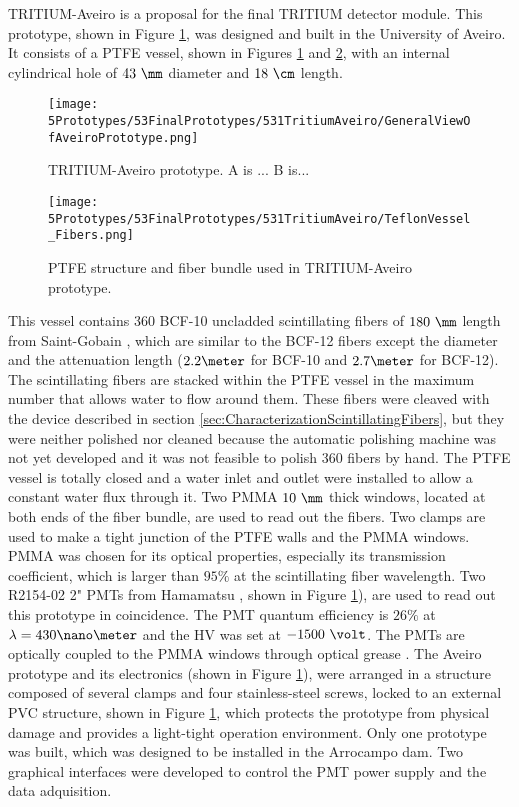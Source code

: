 TRITIUM-Aveiro is a proposal for the final TRITIUM detector module. This prototype, shown in Figure \ref{fig:TritiumAveiro0}, was designed and built in the University of Aveiro. It consists of a PTFE vessel, shown in Figures \ref{fig:TritiumAveiro0} and \ref{fig:TeflonStructureFibersTritiumAveiro0}, with an internal cylindrical hole of $43~\mm$ diameter and $18~\cm$ length.
\begin{figure}[h]
\centering
\texttt{[image: 5Prototypes/53FinalPrototypes/531TritiumAveiro/GeneralViewOfAveiroPrototype.png]}
\caption{TRITIUM-Aveiro prototype. A is ... B is...\label{fig:TritiumAveiro0}}
\end{figure}
\begin{figure}[h]
\centering
\texttt{[image: 5Prototypes/53FinalPrototypes/531TritiumAveiro/TeflonVessel\_Fibers.png]}
\caption{PTFE structure and fiber bundle used in TRITIUM-Aveiro prototype.  \label{fig:TeflonStructureFibersTritiumAveiro0}}
\end{figure}
This vessel contains $360$ BCF-10 uncladded scintillating fibers of $180~\mm$ length from Saint-Gobain \cite{DataSheetBCF12Fiber}, which are similar to the BCF-12 fibers except the diameter and the attenuation length ($2.2\meter$ for BCF-10 and $2.7\meter$ for BCF-12). The scintillating fibers are stacked within the PTFE vessel in the maximum number that allows water to flow around them. These fibers were cleaved with the device described in section \ref{sec:CharacterizationScintillatingFibers}, but they were neither polished nor cleaned because the automatic polishing machine was not yet developed and it was not feasible to polish 360 fibers by hand. The PTFE vessel is totally closed and a water inlet and outlet were installed to allow a constant water flux through it. Two PMMA $10~\mm$ thick windows, located at both ends of the fiber bundle, are used to read out the fibers. Two clamps are used to make a tight junction of the PTFE walls and the PMMA windows. PMMA was chosen for its optical properties, especially its transmission coefficient, which is larger than $95\%$ at the scintillating fiber wavelength. Two R2154-02 2" PMTs from Hamamatsu \cite{DataSheetPMTsAveiro}, shown in Figure \ref{fig:TritiumAveiro0}), are used to read out this prototype in coincidence. The PMT quantum efficiency is $26\%$ at $\lambda=430\nano\meter$ and the HV was set at $-1500~\volt$. The PMTs are optically coupled to the PMMA windows through optical grease \cite{OpticalGrease}. The Aveiro prototype and its electronics (shown in Figure \ref{fig:TritiumAveiro0}), were arranged in a structure composed of several clamps and four stainless-steel screws, locked to an external PVC structure, shown in Figure \ref{fig:TritiumAveiro0}, which protects the prototype from physical damage and provides a light-tight operation environment. Only one prototype was built, which was designed to be installed in the Arrocampo dam. Two graphical interfaces were developed to control the PMT power supply and the data adquisition. 

